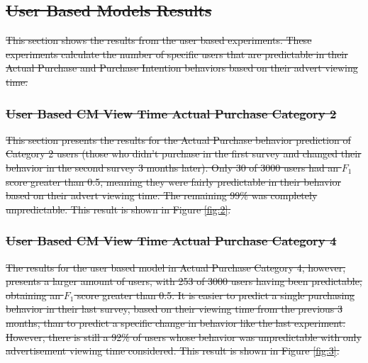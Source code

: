 \documentclass[review]{elsarticle}
\providecommand{\DIFdeltex}[1]{{\protect\color{red}\sout{#1}}}                      %
\providecommand{\DIFdelbegin}{} %
\providecommand{\DIFdelend}{} %
\providecommand{\DIFdel}[1]{\texorpdfstring{\DIFdeltex{#1}}{}} %
\newcommand{\DIFscaledelfig}{0.5}
\newlength{\DIFdelgraphicswidth} %
\newlength{\DIFdelgraphicsheight} %
\newcommand{\DIFdelincludegraphics}[2][]{%
\sbox{\DIFdelgraphicsbox}{\DIFOincludegraphics[#1]{#2}}%
\settoboxwidth{\DIFdelgraphicswidth}{\DIFdelgraphicsbox} %
\settoboxtotalheight{\DIFdelgraphicsheight}{\DIFdelgraphicsbox} %
\scalebox{\DIFscaledelfig}{%
\parbox[b]{\DIFdelgraphicswidth}{\usebox{\DIFdelgraphicsbox}\\[-\baselineskip] \rule{\DIFdelgraphicswidth}{0em}}\llap{\resizebox{\DIFdelgraphicswidth}{\DIFdelgraphicsheight}{%
\setlength{\unitlength}{\DIFdelgraphicswidth}%
\begin{picture}(1,1)%
\thicklines\linethickness{2pt} %
{\color[rgb]{1,0,0}\put(0,0){\framebox(1,1){}}}%
{\color[rgb]{1,0,0}\put(0,0){\line( 1,1){1}}}%
{\color[rgb]{1,0,0}\put(0,1){\line(1,-1){1}}}%
\end{picture}%
}\hspace*{3pt}}} %
} %
\DeclareRobustCommand{\DIFdelbegin}{\DIFOdelbegin \let\includegraphics\DIFdelincludegraphics} %
\DeclareRobustCommand{\DIFdelend}{\DIFOaddend \let\includegraphics\DIFOincludegraphics} %
\begin{document}
\DIFdelbegin \subsection{\DIFdel{User Based Models Results}}
\addtocounter{subsection}{-1}%
\DIFdelend %

\DIFdelbegin \DIFdel{This section shows the results from the user based experiments. These experiments calculate the number of specific users that are predictable in their Actual Purchase and Purchase Intention behaviors based on their advert viewing time.
}\DIFdelend 

\DIFdelbegin \subsubsection{\DIFdel{User Based CM View Time \textperiodcentered  Actual Purchase Category 2}}
\addtocounter{subsubsection}{-1}%

\DIFdel{This section presents the results for the Actual Purchase behavior prediction of Category 2 users (those who didn't purchase in the first survey and changed their behavior in the second survey 3 months later). Only 30 of 3000 users had an \(F_{1}\) score greater than 0.5, meaning they were fairly predictable in their behavior based on their advert viewing time.
The remaining 99\% was completely unpredictable. This result is shown in Figure \ref{fig:2}.
}\DIFdelend 

\DIFdelbegin \subsubsection{\DIFdel{User Based CM View Time \textperiodcentered  Actual Purchase Category 4}}
\addtocounter{subsubsection}{-1}%
\DIFdelend 

\DIFdelbegin \DIFdel{The results for the user based model in Actual Purchase Category 4, however, presents a larger amount of users, with 253 of 3000 users having been predictable, obtaining an \(F_{1}\) score greater than 0.5. It is easier to predict a single purchasing behavior in their last survey, based on their viewing time from the previous 3 months, than to predict a specific change in behavior like the last experiment. However, there is still a 92\% of users whose behavior was unpredictable with only advertisement viewing time considered. This result is shown in Figure \ref{fig:3}. 
}\DIFdelend 
\end{document}

